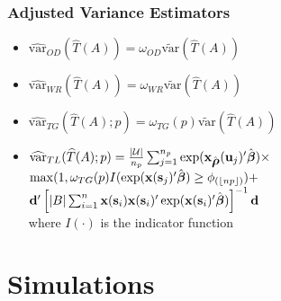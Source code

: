 \documentclass[mathserif,compress]{beamer}\usepackage{graphicx, color}
\def\bd{\mathbf{d}}
\def\bs{\mathbf{s}}
\def\bu{\mathbf{u}}
\def\bx{\mathbf{x}}
\def\cU{\mathcal{U}}
\def\bbeta{\mbox{\boldmath $\beta$}}
\def\brho{\mbox{\boldmath $\rho$}}
\def\var{\textrm{var}}
\def\upp{^\prime}
\def\upi{^{-1}}
\begin{document}
\begin{frame}[fragile]
\frametitle{Adjusted Variance Estimators}

	\begin{itemize}
	\item 
	$\widehat{\var}_{OD}(\widehat{T}(A)) = \omega_{OD}\widetilde{\var}(\widehat{T}(A))$
	\item 
	$\widehat{\var}_{WR}(\widehat{T}(A)) = \omega_{WR}\widetilde{\var}(\widehat{T}(A))$
	\item 
	$\widehat{\var}_{TG}(\widehat{T}(A);p) = \omega_{TG}(p)\widetilde{\var}(\widehat{T}(A))$
	\item 
$\widehat{\var}_{TL}(\widehat{T}(A);p) = \frac{|\cU|}{n_p}\sum_{j=1}^{n_p}\exp(\bx_{\hat{\brho}}(\bu_j)\upp\hat{\bbeta})\times$ $\max(1,\omega_{TG}(p)I(\exp(\bx(\bs_j)\upp \hat{\bbeta}) \ge \phi_{(\lfloor np \rfloor)}) + $  $\bd\upp\left[ |B| \sum_{i=1}^{n} \bx(\bs_i)\bx({\bs_i})\upp\exp(\bx(\bs_i)\upp \hat{\bbeta}) \right]\upi\bd $ \\
where $I(\cdot)$ is the indicator function
	\end{itemize}

\end{frame}


\section{Simulations}
\end{document}
